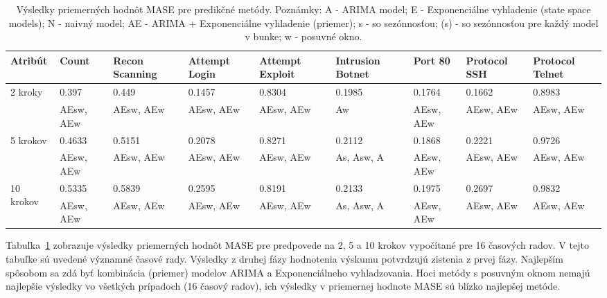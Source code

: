 \documentclass[thesismargins, thesislinespacing, openright, upjsfrontpage, combineabstracts]{rnthesis}
\begin{document}
\begin{table}[h]
    \centering
    \footnotesize 
    \singlespacing 
    \begin{tabular}{|p{2cm}|p{1cm}|p{1.4cm}|p{1.2cm}|p{1.2cm}|p{1.4cm}|p{1cm}|p{1.2cm}|p{1.2cm}|} \hline
        Atribút & Count & Recon Scanning & Attempt Login & Attempt Exploit & Intrusion Botnet & Port 80 & Protocol SSH & Protocol Telnet  \\
        \hline\hline
        \multirow{2}{*}{2 kroky} & 0.397 & 0.449 & 0.1457 & 0.8304 & 0.1985 & 0.1764 & 0.1662 & 0.8983 \\
        & AEsw, AEw & AEsw, AEw & AEsw, AEw & AEsw, AEw & Aw & AEsw, AEw & AEsw, AEw & AEsw, AEw  \\
        \hline
        \multirow{2}{*}{5 krokov} & 0.4633 & 0.5151 & 0.2078 & 0.8271 & 0.2112 & 0.1868 & 0.2221 & 0.9726 \\
        & AEsw, AEw & AEsw, AEw & AEsw, AEw & AEsw, AEw & As, Asw, A & AEsw, AEw & AEsw, AEw & AEsw, AEw  \\
        \hline
        \multirow{2}{*}{10 krokov} & 0.5335 & 0.5839 & 0.2595 & 0.8191 & 0.2133 & 0.1975 & 0.2697 & 0.9832 \\
        & AEsw, AEw & AEsw, AEw & AEsw, AEw & AEsw, AEw & As, Asw, A & AEsw, AEw & AEsw, AEw & AEsw, AEw  \\
        \hline     
    \end{tabular}
    \caption{Výsledky priemerných hodnôt MASE pre predikčné metódy. Poznámky: A - ARIMA model; E - Exponenciálne vyhladenie (state space models); N - naivný model; AE - ARIMA + Exponenciálne vyhladenie (priemer); s - so sezónnosťou; (s) - so sezónnosťou pre každý model v bunke; w - posuvné okno.}
    \label{tab:mase_2nd_stage}
\end{table}

Tabuľka~\ref{tab:mase_2nd_stage} zobrazuje výsledky priemerných hodnôt MASE pre predpovede na 2, 5 a 10 krokov vypočítané pre 16 časových radov. V tejto tabuľke sú uvedené významné časové rady. Výsledky z druhej fázy hodnotenia výskumu potvrdzujú zistenia z prvej fázy. Najlepším spôsobom sa zdá byť kombinácia (priemer) modelov ARIMA a Exponenciálneho vyhladzovania. Hoci metódy s posuvným oknom nemajú najlepšie výsledky vo všetkých prípadoch (16 časový radov), ich výsledky v priemernej hodnote MASE sú blízko najlepšej metóde.
\end{document}
